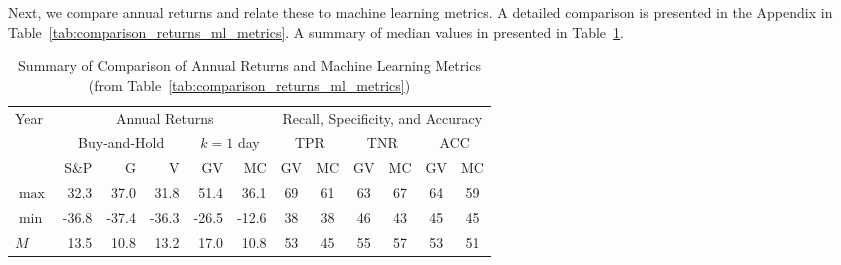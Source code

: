 \documentclass{article}
\begin{document}
Next, we compare annual returns and relate these to machine learning metrics. 
A detailed comparison is presented in the Appendix 
in Table~\ref{tab:comparison_returns_ml_metrics}. A summary of median values in presented in Table~\ref{tab:comparison_returns_ml_metrics_summary}.


\begin{table}[!ht]
    \centering
    \caption{Summary of Comparison of Annual Returns and Machine Learning Metrics (from Table~\ref{tab:comparison_returns_ml_metrics})}
    \medskip
    \begin{tabular}{l || rrr || rr || cc||cc||cc}
    \hline
    \multirow{3}{*}{Year} & \multicolumn{5}{c||}{Annual Returns} & \multicolumn{6}{c}{Recall, Specificity, and Accuracy}  \\
    \cline{2-12}
    & \multicolumn{3}{c||}{Buy-and-Hold}   
& \multicolumn{2}{c||}{$k=1$  day} 
& \multicolumn{2}{c}{TPR}  & \multicolumn{2}{c}{TNR}  & \multicolumn{2}{c}{ACC}  \\ \cline{2-12}
 & S\&P & G & V  & GV  & MC  & GV & MC  & GV  & MC & GV & MC \\ \hline
        $\max$ & 32.3 & \cellcolor{green!25}37.0 & \cellcolor{red!25}31.8 & \cellcolor{green!25}51.4 & 36.1 & \cellcolor{green!25}69 & 61 & 63 & \cellcolor{green!25}67 & \cellcolor{green!25}64 & 59 \\ 
        $\min$ & -36.8 & \cellcolor{red!25}-37.4 & \cellcolor{green!25}-36.3 & -26.5 & \cellcolor{green!25}-12.6 & \cellcolor{green!25}38 & \cellcolor{green!25}38 & \cellcolor{green!25}46 & 43 & 45 & \cellcolor{green!25}45 \\ 
        $M$ & \cellcolor{green!25}13.5 & \cellcolor{red!25}10.8 & 13.2 & \cellcolor{green!25}17.0 & 10.8 & \cellcolor{green!25}53 & 45 & 55 & \cellcolor{green!25}57 & \cellcolor{green!25}53 & 51 \\ 

\hline
    \end{tabular}
    \label{tab:comparison_returns_ml_metrics_summary}
\end{table}
\end{document}

